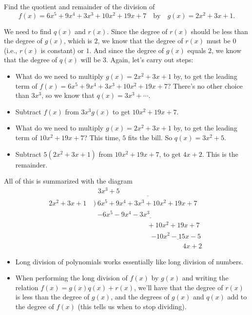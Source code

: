 \documentclass{ximera}
\begin{document}
\begin{example}
  Find the quotient and remainder of the division of $$f(x) = 6x^5+9x^4+3x^3+10x^2+19x+7\quad\mbox{by}\quad g(x) = 2x^2+3x+1.$$
  
  \begin{explanation}
    We need to find $q(x)$ and $r(x)$. Since the degree of $r(x)$ should be less than the degree of $g(x)$, which is $2$, we know that the degree of $r(x)$ must be $0$ (i.e., $r(x)$ is constant) or $1$. And since the degree of $g(x)$ equals $2$, we know that the degree of $q(x)$ will be $3$. Again, let's carry out steps:
    \begin{itemize}
    \item What do we need to multiply $g(x) = 2x^2+3x+1$ by, to get the leading term of $f(x) = 6x^5+9x^4+3x^3+10x^2+19x+7$? There's no other choice than $3x^3$, so we know that $q(x) = 3x^3+\cdots$.
    \item Subtract $f(x)$ from $3x^3g(x)$ to get $10x^2+19x+7$.
    \item What do we need to multiply $g(x) = 2x^2+3x+1$ by, to get the leading term of $10x^2+19x+7$? This time, $5$ fits the bill. So $q(x) = 3x^2+5$.
    \item Subtract $5(2x^2+3x+1)$ from $10x^2+19x+7$, to get $4x+2$. This is the remainder.
    \end{itemize}
All of this is summarized with the diagram \begin{align*}
   & \underline{~~~3x^3+5\phantom{somethingssomethingssom}} \\[-4pt]  2x^2+3x+1~&\Big)~6x^5+9x^4+3x^3+10x^2+19x+7 \\[-4pt] &\phantom{\big)~} \underline{-6x^5-9x^4-3x^3\phantom{............................}} \\[-4pt] &\phantom{\Big)~}\phantom{..........................}+10x^2+19x+7 \\[-4pt] &\phantom{\big).............................}\underline{-10x^2-15x-5\phantom{..}} \\[-3pt] &\phantom{...............................................}4x+2
\end{align*}

    
  \end{explanation}
\end{example}


\begin{summary}\begin{itemize}
\item Long division of polynomials works essentially like long division of numbers. 
\item When performing the long division of $f(x)$ by $g(x)$ and writing the relation $f(x) = g(x)q(x)+r(x)$, we'll have that the degree of $r(x)$ is less than the degree of $g(x)$, and the degrees of $g(x)$ and $q(x)$ add to the degree of $f(x)$ (this tells us when to stop dividing).
\end{itemize}\end{summary}
\end{document}
